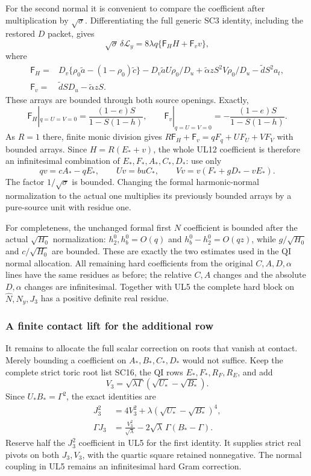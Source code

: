 For the second normal it is convenient to compare the coefficient
after multiplication by $\sqrt\sigma$. Differentiating the full
generic SC3 identity, including the restored $D$ packet, gives
\[
 \sqrt\sigma\,\delta\mathcal L_y
       =8\lambda q\{\mathsf F_HH+\mathsf F_vv\},                 \tag{UL12}
\]
where
\[
\begin{split}
\mathsf F_H={}&D_v\{\rho_0\widetilde a
                    -(1-\rho_0)\widetilde c\}
 -D_v\widetilde aU\rho_0/D_u
 +\widetilde\alpha zS^2V\rho_0/D_u
 -\widetilde dS^2a_t,\\
\mathsf F_v={}&\widetilde dSD_u-\widetilde\alpha zS.
\end{split}
\]
These arrays are bounded through both source openings. Exactly,
\[
 \mathsf F_H|_{q=U=V=0}
       =\frac{(1-e)S}{1-S(1-h)},\qquad
 \mathsf F_v|_{q=U=V=0}
       =-\frac{(1-e)S}{1-S(1-h)}.                              \tag{UL13}
\]
As $R=1$ there, finite monic division gives
$R\mathsf F_H+\mathsf F_v=qF_q+UF_U+VF_V$ with bounded
arrays. Since $H=R(E_*+v)$, the whole UL12 coefficient is
therefore an infinitesimal combination of $E_*,F_*,A_*,C_*,D_*$:
use only
\[
 qv=cA_*-qE_*,\qquad Uv=buC_*,\qquad
 Vv=v(F_*+gD_*-vE_*).                                         \tag{UL14}
\]
The factor $1/\sqrt\sigma$ is bounded.
Changing the formal harmonic-normal normalization to the actual
one multiplies its previously bounded arrays by a pure-source
unit with residue one.

For completeness, the unchanged formal first $N$ coefficient is
bounded after the actual $\sqrt{H_0}$ normalization:
$h_2^0,h_b^0=O(q)$ and $h_b^0-h_2^0=O(qz)$, while
$g/\sqrt{H_0}$ and $c/\sqrt{H_0}$ are bounded. These are exactly
the two estimates used in the QI normal allocation.
All remaining hard coefficients from the original $C,A,D,\alpha$
lines have the same residues as before; the relative $C,A$
changes and the absolute $D,\alpha$ changes are infinitesimal.
Together with UL5 the complete hard block on
$\widehat N,N_y,J_3$ has a positive definite real residue.

\subsubsection*{A finite contact lift for the additional row}

It remains to allocate the full scalar correction on roots that
vanish at contact. Merely bounding a coefficient on $A_*,B_*,C_*,D_*$
would not suffice. Keep the complete strict toric root list SC16,
the QI rows $E_*,F_*,R_F,R_E$, and add
\[
 V_3=\sqrt{\lambda\Gamma}(\sqrt{U_*}-\sqrt{B_*}).
\]
Since $U_*B_*=\Gamma^2$, the exact identities are
\[
\begin{split}
 J_3^2&=4V_3^2+\lambda(\sqrt{U_*}-\sqrt{B_*})^4,\\
 \Gamma J_3&=\frac{V_3^2}{\sqrt\lambda}
                      -2\sqrt\lambda\,\Gamma(B_*-\Gamma).
\end{split}                                                     \tag{UL15}
\]
Reserve half the $J_3^2$ coefficient in UL5 for the first
identity. It supplies strict real pivots on both $J_3,V_3$,
with the quartic square retained nonnegative. The normal
coupling in UL5 remains an infinitesimal hard Gram correction.

